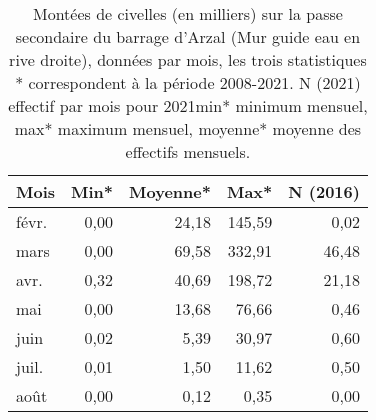 \begin{table}[htbp]
\centering
\begin{tabular}{lrrrr}
  \hline
Mois & Min* & Moyenne* & Max* & N (2016) \\ 
  \hline
févr. & 0,00 & 24,18 & 145,59 & 0,02 \\ 
  mars & 0,00 & 69,58 & 332,91 & 46,48 \\ 
  avr. & 0,32 & 40,69 & 198,72 & 21,18 \\ 
  mai & 0,00 & 13,68 & 76,66 & 0,46 \\ 
  juin & 0,02 & 5,39 & 30,97 & 0,60 \\ 
  juil. & 0,01 & 1,50 & 11,62 & 0,50 \\ 
  août & 0,00 & 0,12 & 0,35 & 0,00 \\ 
   \hline
\end{tabular}
\caption{Montées de civelles \textsf{(en milliers)} sur la passe secondaire du barrage d'Arzal (Mur guide eau en rive droite), données
        par mois, les trois statistiques * correspondent à la période
        2008-2021. \textsf{N (2021)} effectif par mois pour 2021\textsf{min}* minimum mensuel, 
        \textsf{max}* maximum mensuel, 
        \textsf{moyenne}* moyenne des effectifs mensuels.} 
\label{table_civelle_mois_12}
\end{table}
